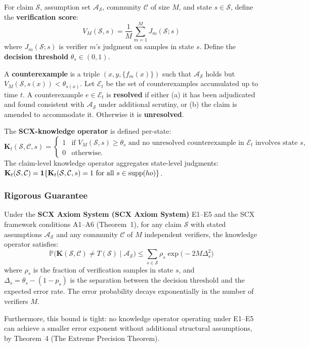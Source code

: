 \begin{definition}
\label{def:K-operator}
For claim $\mathcal{S}$, assumption set $\mathcal{A}_{\mathcal{S}}$,
community $\mathcal{C}$ of size $M$, and state $s\in\mathcal{S}$, define
the \textbf{verification score}:
\[
V_M(\mathcal{S}, s) = \frac{1}{M}\sum_{m=1}^{M} J_m(\mathcal{S}; s)
\]
where $J_m(\mathcal{S}; s)$ is verifier $m$'s judgment on samples in
state $s$. Define the \textbf{decision threshold} $\theta_s \in (0,1)$.

A \textbf{counterexample} is a triple $(x, y, \{f_m(x)\})$ such that
$\mathcal{A}_{\mathcal{S}}$ holds but $V_M(\mathcal{S}, s(x)) < \theta_{s(x)}$.
Let $\mathcal{E}_t$ be the set of counterexamples accumulated up to time $t$.
A counterexample $e \in \mathcal{E}_t$ is \textbf{resolved} if either (a) it
has been adjudicated and found consistent with $\mathcal{A}_{\mathcal{S}}$
under additional scrutiny, or (b) the claim is amended to accommodate it.
Otherwise it is \textbf{unresolved}.

The \textbf{SCX-knowledge operator} is defined per-state:
\[
\mathbf{K}_{t}(\mathcal{S}, \mathcal{C}, s) =
\begin{cases}
1 & \text{if } V_M(\mathcal{S}, s) \geq \theta_s
      \text{ and no unresolved counterexample in } \mathcal{E}_t
      \text{ involves state } s,\\[4pt]
0 & \text{otherwise.}
\end{cases}
\]
The claim-level knowledge operator aggregates state-level judgments:
$\mathbf{K}_{t}(\mathcal{S}, \mathcal{C}) = \mathbf{1}\{\mathbf{K}_t(\mathcal{S},
\mathcal{C}, s) = 1 \text{ for all } s \in \mathrm{supp}(
ho)\}$.
\end{definition}

\subsubsection{Rigorous Guarantee}
\label{sec:epistemic-guarantee}

\begin{theorem}
\label{thm:epistemic-rigorous}
Under the \textbf{SCX Axiom System (SCX Axiom System)} E1--E5 and the SCX framework conditions A1--A6
(Theorem~1), for any claim $\mathcal{S}$ with stated assumptions
$\mathcal{A}_{\mathcal{S}}$ and any community $\mathcal{C}$ of $M$
independent verifiers, the knowledge operator satisfies:
\[
\boxed{\mathbb{P}\bigl(\mathbf{K}(\mathcal{S},\mathcal{C}) \neq T(\mathcal{S})
  \mid \mathcal{A}_{\mathcal{S}}\bigr)
  \leq \sum_{s\in\mathcal{S}} \rho_s \exp\bigl(-2M\Delta_s^2\bigr)}
\]
where $\rho_s$ is the fraction of verification samples in state $s$,
and $\Delta_s = \theta_s - (1-p_s)$ is the separation between the
decision threshold and the expected error rate. The error probability
decays exponentially in the number of verifiers $M$.

Furthermore, this bound is tight: no knowledge operator operating under
E1--E5 can achieve a smaller error exponent without additional structural
assumptions, by Theorem~4 (The Extreme Precision Theorem).
\end{theorem}

